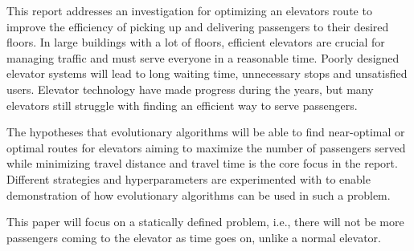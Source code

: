 
This report addresses an investigation for optimizing an elevators route to improve the efficiency of picking up and delivering passengers to their desired floors.
In large buildings with a lot of floors, efficient elevators are crucial for managing traffic and must serve everyone in a reasonable time.
Poorly designed elevator systems will lead to long waiting time, unnecessary stops and unsatisfied users.
Elevator technology have made progress during the years, but many elevators still struggle with finding an efficient way
to serve passengers.

The hypotheses that evolutionary algorithms will be able to find near-optimal or optimal routes for elevators
aiming to maximize the number of passengers served while minimizing travel distance and travel time is
the core focus in the report. Different strategies and hyperparameters are experimented with to enable
demonstration of how evolutionary algorithms can be used in such a problem.

This paper will focus on a statically defined problem, i.e., there will not be more passengers coming to the elevator as time goes on, unlike a normal elevator.
